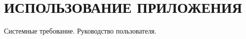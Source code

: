 \section[Использование приложения]{%
  ИСПОЛЬЗОВАНИЕ ПРИЛОЖЕНИЯ
}

\label{sec:usage}

Системные требование. Руководство пользователя.